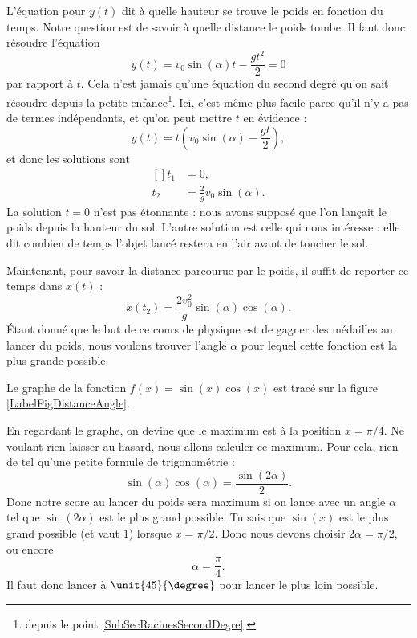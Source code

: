 L'équation pour $y(t)$ dit à quelle hauteur se trouve le poids en fonction du temps. Notre question est de savoir à quelle distance le poids tombe. Il faut donc résoudre l'équation
\begin{equation}
	y(t)=v_0\sin(\alpha) t -\frac{ gt^2 }{ 2 }=0
\end{equation}
par rapport à $t$. Cela n'est jamais qu'une équation du second degré qu'on sait résoudre depuis la petite enfance\footnote{depuis le point \ref{SubSecRacinesSecondDegre}.}. Ici, c'est même plus facile parce qu'il n'y a pas de termes indépendants, et qu'on peut mettre $t$ en évidence :
\begin{equation}
	y(t)=t\left( v_0\sin(\alpha)-\frac{ gt }{ 2 } \right),
\end{equation}
et donc les solutions sont
\begin{equation}
	\begin{aligned}[]
		t_1&=0,\\
		t_2&=\frac{ 2 }{ g }v_0\sin(\alpha).
	\end{aligned}
\end{equation}
La solution $t=0$ n'est pas étonnante : nous avons supposé que l'on lançait le poids depuis la hauteur du sol. L'autre solution est celle qui nous intéresse : elle dit combien de temps l'objet lancé restera en l'air avant de toucher le sol.

Maintenant, pour savoir la distance parcourue par le poids, il suffit de reporter ce temps dans $x(t)$ :
\begin{equation}			\label{EqDistancePoinds}
	x(t_2)=\frac{ 2v_0^2 }{ g }\sin(\alpha)\cos(\alpha).
\end{equation}
Étant donné que le but de ce cours de physique est de gagner des médailles au lancer du poids, nous voulons trouver l'angle $\alpha$ pour lequel cette fonction est la plus grande possible.

Le graphe de la fonction $f(x)=\sin(x)\cos(x)$ est tracé sur la figure \ref{LabelFigDistanceAngle}.
\newcommand{\CaptionFigDistanceAngle}{En bleu, la fonction qui nous intéresse : $\sin(x)\cos(x)$. Pour information, en rouge se trouve la fonction $\sin(x)$}


En regardant le graphe, on devine que le maximum est à la position $x=\pi/4$. Ne voulant rien laisser au hasard, nous allons calculer ce maximum. Pour cela, rien de tel qu'une petite formule de trigonométrie :
\begin{equation}
	\sin(\alpha)\cos(\alpha)=\frac{ \sin(2\alpha) }{2}.
\end{equation}
Donc notre score au lancer du poids sera maximum si on lance avec un angle $\alpha$ tel que $\sin(2\alpha)$ est le plus grand possible. Tu sais que $\sin(x)$ est le plus grand possible (et vaut $1$) lorsque $x=\pi/2$. Donc nous devons choisir $2\alpha=\pi/2$, ou encore
\begin{equation}
	\alpha=\frac{ \pi }{ 4 }.
\end{equation}
Il faut donc lancer à $\unit{45}{\degree}$ pour lancer le plus loin possible.

